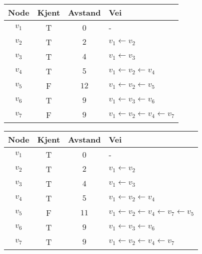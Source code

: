\begin{eks}
\begin{center}
\begin{tabular}{c | c | c | l}
	 Node   & Kjent & Avstand & Vei                                                  \\ \hline
	$ v_1 $ & T     & 0       & -                                                    \\
	$ v_2 $ & T     & $ 2 $   & $ v_1 \leftarrow v_2 $                               \\
	$ v_3 $ & T     & $ 4 $   & $ v_1 \leftarrow v_3 $                               \\
	$ v_4 $ & T     & $ 5 $   & $ v_1 \leftarrow v_2 \leftarrow v_4 $                \\
	$ v_5 $ & F     & $ 12 $  & $ v_1 \leftarrow v_2 \leftarrow v_5 $                \\
	$ v_6 $ & T     & $ 9 $   & $ v_1 \leftarrow v_3 \leftarrow v_6 $                \\
	$ v_7 $ & F     & $ 9 $   & $ v_1 \leftarrow v_2 \leftarrow v_4 \leftarrow v_7 $
\end{tabular}
\end{center}
\begin{center}
\begin{tabular}{c | c | c | l}
	 Node   & Kjent & Avstand & Vei                                                                 \\ \hline
	$ v_1 $ & T     & 0       & -                                                                   \\
	$ v_2 $ & T     & $ 2 $   & $ v_1 \leftarrow v_2 $                                              \\
	$ v_3 $ & T     & $ 4 $   & $ v_1 \leftarrow v_3 $                                              \\
	$ v_4 $ & T     & $ 5 $   & $ v_1 \leftarrow v_2 \leftarrow v_4 $                               \\
	$ v_5 $ & F     & $ 11 $  & $ v_1 \leftarrow v_2 \leftarrow v_4 \leftarrow v_7 \leftarrow v_5 $ \\
	$ v_6 $ & T     & $ 9 $   & $ v_1 \leftarrow v_3 \leftarrow v_6 $                               \\
	$ v_7 $ & T     & $ 9 $   & $ v_1 \leftarrow v_2 \leftarrow v_4 \leftarrow v_7 $
\end{tabular}
\end{center}
\begin{center}
\begin{tabular}{c | c | c | l}

\end{tabular}
\end{center}
\end{eks}
